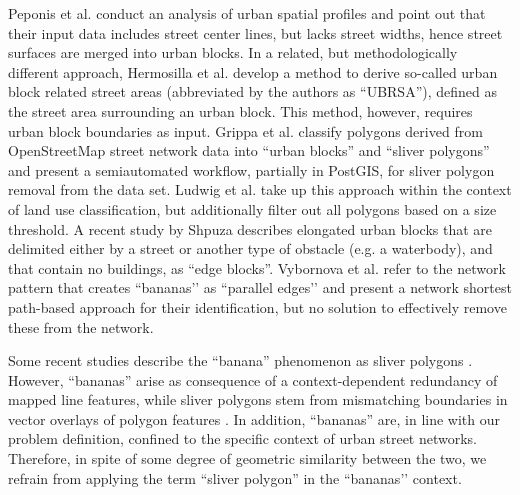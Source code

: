 Peponis et al. \cite{peponis_measuring_2007} conduct an analysis of urban spatial profiles and point out that their input data includes street center lines, but lacks street widths, hence street surfaces are merged into urban blocks. In a related, but methodologically different approach, Hermosilla et al. \cite{hermosilla_using_2014} develop a method to derive so-called urban block related street areas (abbreviated by the authors as ``UBRSA''), defined as the street area surrounding an urban block. This method, however, requires urban block boundaries as input. Grippa et al. \cite{grippa_mapping_2018} classify polygons derived from OpenStreetMap street network data into ``urban blocks'' and ``sliver polygons'' and present a semiautomated workflow, partially in PostGIS, for sliver polygon removal from the data set. Ludwig et al. \cite{ludwig_mapping_2021} take up this approach within the context of land use classification, but additionally filter out all polygons based on a size threshold. A recent study by Shpuza \cite{shpuza_shape_2022} describes elongated urban blocks that are delimited either by a street or another type of obstacle (e.g. a waterbody), and that contain no buildings, as ``edge blocks''. Vybornova et al. \cite{vybornova_automated_nodate} refer to the network pattern that creates ``bananas’’ as ``parallel edges’’ and present a network shortest path-based approach for their identification, but no solution to effectively remove these from the network.

Some recent studies describe the ``banana'' phenomenon as sliver polygons \cite{grippa_mapping_2018, sanzana_decomposition_2018, ludwig_mapping_2021}. However, ``bananas'' arise as consequence of a context-dependent redundancy of mapped line features, while sliver polygons stem from mismatching boundaries in vector overlays of polygon features \cite{goodchild_statistical_1978, fischer_using_1993, delafontaine_assessment_2009}. In addition, ``bananas'' are, in line with our problem definition, confined to the specific context of urban street networks. Therefore, in spite of some degree of geometric similarity between the two, we refrain from applying the term ``sliver polygon'' in the ``bananas’’ context.